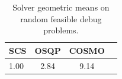 \begin{table}
\centering
\caption{Solver geometric means on random feasible debug problems.}
\label{t-random feasible debug-geom_mean}
\begin{tabular}{lccc}
\toprule
 SCS &  OSQP &  COSMO \\
\midrule
1.00 &  2.84 &   9.14 \\
\bottomrule
\end{tabular}
\end{table}

